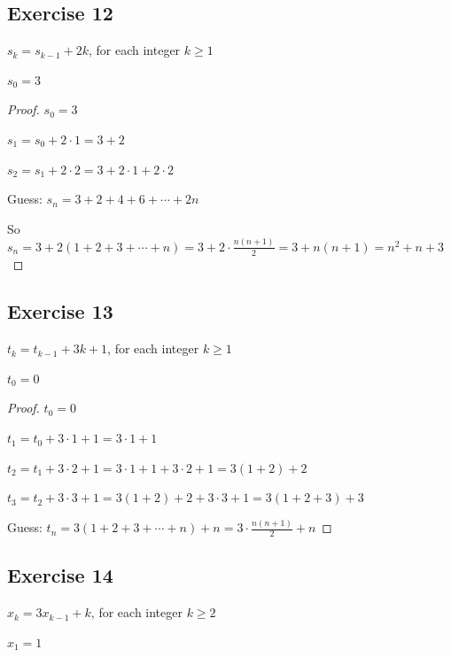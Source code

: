 \documentclass[14pt]{extarticle}
\newcommand{\dps}{\displaystyle}
\begin{document}
\subsection{Exercise 12}
\(s_k = s_{k-1} + 2k\), for each integer \(k \geq 1\)

\(s_0 = 3\)

\begin{proof}
\(s_0 = 3\)

\(s_1 = s_0 + 2 \cdot 1 = 3 + 2\)

\(s_2 = s_1 + 2 \cdot 2 = 3 + 2 \cdot 1 + 2 \cdot 2\)

Guess: \(s_n = 3 + 2 + 4 + 6 + \cdots + 2n\)

So \(s_n = 3 + 2(1 + 2 + 3 + \cdots + n) = 3 + 2 \cdot \frac{n(n+1)}{2} = 3 + n(n+1) = n^2 + n + 3\)
\end{proof}

\subsection{Exercise 13}
\(t_k = t_{k-1} + 3k + 1\), for each integer \(k \geq 1\)

\(t_0 = 0\)

\begin{proof}
\(t_0 = 0\)

\(t_1 = t_0 + 3 \cdot 1 + 1 = 3 \cdot 1 + 1\)

\(t_2 = t_1 + 3 \cdot 2 + 1 = 3 \cdot 1 + 1 + 3 \cdot 2 + 1 = 3(1+2)+2\)

\(t_3 = t_2 + 3 \cdot 3 + 1 = 3(1+2)+2 + 3 \cdot 3 + 1 = 3(1+2+3)+3\)

Guess: \(\dps t_n = 3(1+2+3+\cdots+n)+n = 3 \cdot \frac{n(n+1)}{2} + n\)
\end{proof}

\subsection{Exercise 14}
\(x_k = 3x_{k-1} + k\), for each integer \(k \geq 2\)

\(x_1 = 1\)
\end{document}
